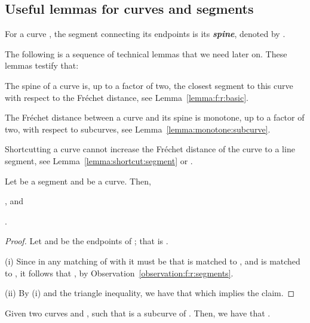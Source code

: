 \documentclass[12pt]{article}
\newcommand{\seclab}[1]{\label{sec:#1}}
\newcommand{\lemlab}[1]{\label{lemma:#1}}
\newcommand{\lemref}[1]{Lemma~\ref{lemma:#1}}
\newcommand{\deflab}[1]{\label{def:#1}}
\newcommand{\obsref}[1]{Observation~\ref{observation:#1}}
\newcommand{\itemlab}[1]{\label{item:#1}}
\newcommand{\emphic}[2]{\textcolor{blue25}{\textbf{\emph{#1}}}\index{#2}}
\newcommand{\emphi}[1]{\emphic{#1}{#1}}
\newcommand{\Frechet}{Fr\'{e}c{h}e{}t\xspace}\providecommand{\Arr}{\mathop{\mathrm{\EuScript{A}}}}
\numberwithin{figure}{section}
\numberwithin{equation}{section}
\newcommand{\matching}{matching\xspace}
\begin{document}
\subsection{Useful lemmas for curves and segments}
\seclab{query:helper}

\begin{defn}\deflab{spine}
    For a curve , the segment connecting its endpoints is its
    \emphi{spine}, denoted by .
\end{defn}

The following is a sequence of technical lemmas that we need later
on. These lemmas testify that:
\begin{compactenum}[\quad (A)]
    \item The spine of a curve is, up to a factor of two, the closest
    segment to this curve with respect to the \Frechet distance, see
    \lemref{f:r:basic}.
    
    \item The \Frechet distance between a curve and its spine is
    monotone, up to a factor of two, with respect to subcurves, see
    \lemref{monotone:subcurve}.
    
    \item Shortcutting a curve cannot increase the \Frechet distance
    of the curve to a line segment, see \lemref{shortcut:segment} or
    \cite{bbw-cfdsp-08}.
\end{compactenum}

\begin{lemma}\lemlab{f:r:basic}Let  be a segment and  be a curve.  Then,
    \begin{inparaenum}[(i)]
        \item \itemlab{shortcut} 
        , and
        \item .
    \end{inparaenum}
\end{lemma}

\begin{proof}
    Let  and  be the endpoints of ; that is
    .
    
    (i) Since in any \matching{} of  with  it must be
    that  is matched to , and  is matched to
    , it follows that , by
    \obsref{f:r:segments}.
    
    (ii) By (i) and the triangle inequality, we have that
     which implies the claim.
\end{proof}


\begin{lemma}\lemlab{monotone:subcurve}Given two curves  and , such that  is a
    subcurve of .  Then, we have that
    .
\end{lemma}
\end{document}
